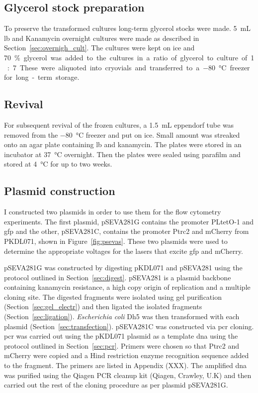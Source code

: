 \subsection{Glycerol stock preparation}
\label{sec:glycerol_stock}
To preserve the transformed cultures long-term glycerol stocks were made. \SI{5}{\milli\liter} \acrshort{lb} and Kanamycin overnight cultures were made as described in Section~\ref{sec:overnigh_cult}. The cultures were kept on ice and \SI{70}\% glycerol was added to the cultures in a ratio of glycerol to culture of 1:7. These were aliquoted into cryovials and transferred to a \SI{-80}{\celsius} freezer for long-term storage.


\subsection{Revival}
For subsequent revival of the frozen cultures, a \SI{1.5}{\milli\liter} eppendorf tube was removed from the \SI{-80}{\celsius} freezer and put on ice. Small amount was streaked onto an agar plate containing \acrshort{lb} and kanamycin. The plates were stored in an incubator at \SI{37}{\celsius} overnight. Then the plates were sealed using parafilm and stored at \SI{4}{\celsius} for up to two weeks. 


\subsection{Plasmid construction}

I constructed two plasmids in order to use them for the flow cytometry experiments. The first plasmid, pSEVA281G contains the promoter PLtetO-1 and \acrshort{gfp} and the other, pSEVA281C, contains the promoter Ptrc2 and mCherry from PKDL071, shown in Figure~\ref{fig:psevas}. These two plasmids were used to determine the appropriate voltages for the lasers that excite \acrshort{gfp} and mCherry.

pSEVA281G was constructed by digesting pKDL071 and pSEVA281 using the protocol outlined in Section~\ref{sec:digest}. pSEVA281 is a plasmid backbone containing kanamycin resistance, a high copy origin of replication and a multiple cloning site. The digested fragments were isolated using gel purification (Section~\ref{sec:gel_electr}) and then ligated the isolated fragments (Section~\ref{sec:ligation}). \textit{Escherichia coli} Dh5\textalpha{} was then transformed with each plasmid (Section~\ref{sec:transfection}). pSEVA281C was constructed via \acrshort{pcr} cloning. \acrshort{pcr} was carried out using the pKDL071 plasmid as a template \acrshort{dna} using the protocol outlined in Section~\ref{sec:pcr}. Primers were chosen so that Ptrc2 and mCherry were copied and a Hind restriction enzyme recognition sequence added to the fragment. The primers are listed in Appendix (XXX). The amplified \acrshort{dna} was purified using the Qiagen PCR cleanup kit (Qiagen, Crawley, U.K) and then carried out the rest of the cloning procedure as per plasmid pSEVA281G.


